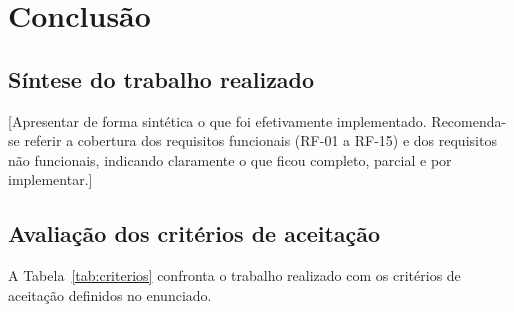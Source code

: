 
\chapter{Conclusão}
\label{cap:conclusao}



\section{Síntese do trabalho realizado}
\label{sec:sintese}


[Apresentar de forma sintética o que foi efetivamente
implementado. Recomenda-se referir a cobertura dos requisitos
funcionais (RF-01 a RF-15) e dos requisitos não funcionais,
indicando claramente o que ficou completo, parcial e por
implementar.]


\section{Avaliação dos critérios de aceitação}
\label{sec:criterios}


A Tabela~\ref{tab:criterios} confronta o trabalho realizado com
os critérios de aceitação definidos no enunciado.

